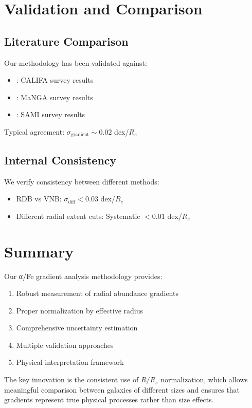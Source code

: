\documentclass[11pt,a4paper]{article}
\begin{document}
\section{Validation and Comparison}

\subsection{Literature Comparison}

Our methodology has been validated against:
\begin{itemize}
\item \citet{Liu2016}: CALIFA survey results
\item \citet{Li2019}: MaNGA survey results  
\item \citet{Goddard2017}: SAMI survey results
\end{itemize}

Typical agreement: $\sigma_{\text{gradient}} \sim 0.02$ dex/$R_e$

\subsection{Internal Consistency}

We verify consistency between different methods:
\begin{itemize}
\item RDB vs VNB: $\sigma_{\text{diff}} < 0.03$ dex/$R_e$
\item Different radial extent cuts: Systematic $< 0.01$ dex/$R_e$
\end{itemize}

\section{Summary}

Our α/Fe gradient analysis methodology provides:

\begin{enumerate}
\item Robust measurement of radial abundance gradients
\item Proper normalization by effective radius
\item Comprehensive uncertainty estimation
\item Multiple validation approaches
\item Physical interpretation framework
\end{enumerate}

The key innovation is the consistent use of $R/R_e$ normalization, which allows meaningful comparison between galaxies of different sizes and ensures that gradients represent true physical processes rather than size effects.
\end{document}
